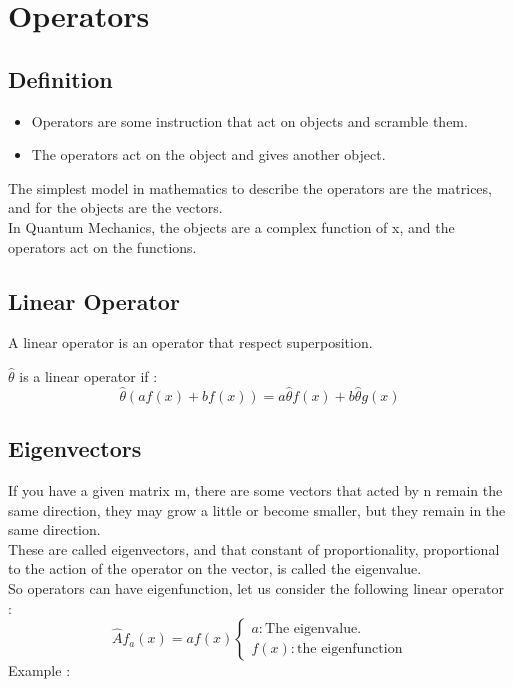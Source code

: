 \documentclass[12pt,oneside]{book}
\begin{document}
\section{Operators}
\subsection{Definition}
\begin{itemize}
	\item Operators are some instruction that act on objects and scramble them.
	\item The operators act on the object and gives another object.
\end{itemize}
The simplest model in mathematics to describe the operators are the matrices, and for the objects are the vectors.\\
In Quantum Mechanics, the objects are a complex function of x, and the operators act on the functions.\\
\subsection{Linear Operator}
\begin{center}
	A linear operator is an operator that respect superposition.
\end{center}
$\widehat{\theta}$ is a linear operator if :
\[\widehat{\theta}(af(x)+bf(x)) = a\widehat{\theta}f(x) + b\widehat{\theta}g(x )\]
\subsection{Eigenvectors}
If you have a given matrix m, there are some vectors that acted by n remain the same direction, they may grow a little or become smaller, but they remain in the same direction.\\
These are called eigenvectors, and that constant of proportionality, proportional to the action of the operator on the vector, is called the eigenvalue.\\
So operators can have eigenfunction, let us consider the following linear operator :
\[\hat{A}f_a(x) = af(x)\begin{cases}
		a : \text{The eigenvalue.} \\
		f(x): \text{the eigenfunction}
	\end{cases}\]
Example : \\
\end{document}
